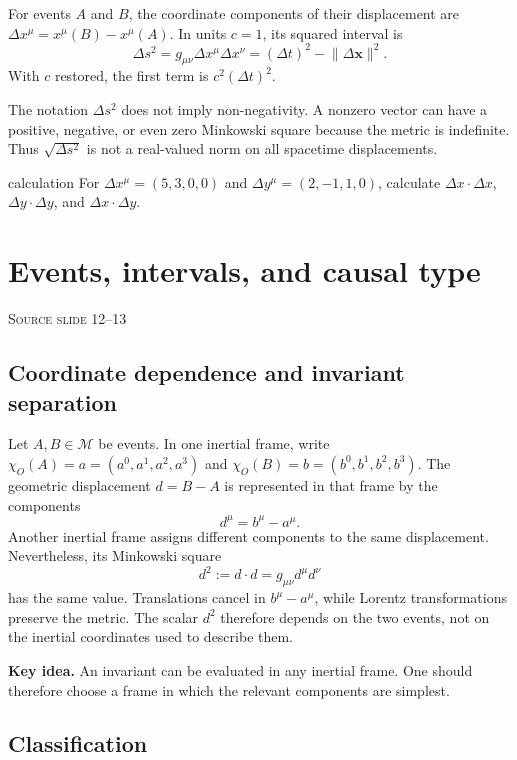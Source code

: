 \documentclass[11pt,a4paper]{article}
\newcommand{\vect}[1]{\bm{#1}}
\newcommand{\slideref}[1]{%
  \par\smallskip
  {\footnotesize\color{ink!60}\textsc{Source slide #1}}\par
}
\newcommand{\keyidea}[1]{%
  \par\smallskip
  \begin{minipage}{\linewidth}
  \noindent\textbf{\color{vuBurgundy}Key idea.} #1
  \end{minipage}
  \par\smallskip
}
\begin{document}
For events \(A\) and \(B\), the coordinate components of their displacement
are \(\Delta x^\mu=x^\mu(B)-x^\mu(A)\). In units \(c=1\), its squared interval
is
\[
  \Delta s^2
  =g_{\mu\nu}\Delta x^\mu\Delta x^\nu
  =(\Delta t)^2-\lVert\Delta\vect{x}\rVert^2.
\]
With \(c\) restored, the first term is \(c^2(\Delta t)^2\).

\begin{precision}
The notation \(\Delta s^2\) does not imply non-negativity. A nonzero vector can
have a positive, negative, or even zero Minkowski square because the metric is
indefinite. Thus \(\sqrt{\Delta s^2}\) is not a real-valued norm on all
spacetime displacements.
\end{precision}

\begin{studentwork}[height=5.5cm]{calculation}
For \(\Delta x^\mu=(5,3,0,0)\) and
\(\Delta y^\mu=(2,-1,1,0)\), calculate
\(\Delta x\cdot\Delta x\), \(\Delta y\cdot\Delta y\), and
\(\Delta x\cdot\Delta y\).
\end{studentwork}

\section{Events, intervals, and causal type}
\slideref{12--13}

\subsection{Coordinate dependence and invariant separation}

Let \(A,B\in\mathcal M\) be events. In one inertial frame, write
\(\chi_O(A)=a=(a^0,a^1,a^2,a^3)\) and
\(\chi_O(B)=b=(b^0,b^1,b^2,b^3)\). The geometric displacement \(d=B-A\) is
represented in that frame by the components
\[
  d^\mu=b^\mu-a^\mu.
\]
Another inertial frame assigns different components to the same displacement.
Nevertheless, its Minkowski square
\[
  d^2:=d\cdot d=g_{\mu\nu}d^\mu d^\nu
\]
has the same value. Translations cancel in \(b^\mu-a^\mu\), while Lorentz
transformations preserve the metric. The scalar \(d^2\) therefore depends on
the two events, not on the inertial coordinates used to describe them.

\keyidea{An invariant can be evaluated in any inertial frame. One should
therefore choose a frame in which the relevant components are simplest.}

\subsection{Classification}
\end{document}

